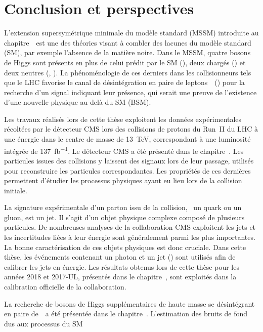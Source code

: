 \chapter*{Conclusion et perspectives}\label{chapter-conclusion}

L'extension supersymétrique minimale du modèle standard (MSSM)
introduite au chapitre~\
est une des théories visant à combler des lacunes du modèle standard (SM),
par exemple l'absence de la matière noire.
Dans le MSSM,
quatre bosons de Higgs sont présents en plus de celui prédit par le SM (\higgs),
deux chargés (\Higgspm)
et
deux neutres (\Higgs, \HiggsA).
La phénoménologie de ces derniers dans les collisionneurs tels que le LHC
favorise le canal de désintégration en paire de leptons~\tau\
(\HAtoTauTau)
pour la recherche d'un signal indiquant leur présence,
qui serait une preuve de l'existence d'une nouvelle physique
au-delà du SM (BSM).
\par
Les travaux réalisés lors de cette thèse
exploitent les données expérimentales
récoltées par le détecteur CMS
lors des collisions de protons du Run~II du LHC
à une énergie dans le centre de masse de \SI{13}{\TeV},
correspondant à une luminosité intégrée de \SI{137}{\femto\barn^{-1}}.
Le détecteur CMS a été présenté dans le chapitre~.
Les particules issues des collisions y laissent des signaux lors de leur passage,
utilisés pour reconstruire les particules correspondantes.
Les propriétés de ces dernières permettent d'étudier les processus physiques
ayant eu lieu lors de la collision initiale.
\par
La signature expérimentale
d'un parton issu de la collision, \ie\ un quark ou un gluon,
est un jet.
Il s'agit d'un objet physique complexe
composé de plusieurs particules.
De nombreuses analyses de la collaboration CMS exploitent les jets
et
les incertitudes liées à leur énergie sont généralement parmi les plus importantes.
La bonne caractérisation de ces objets physiques est donc cruciale.
Dans cette thèse,
les événements contenant un photon et un jet (\Gjet)
sont utilisés afin de calibrer les jets en énergie.
Les résultats obtenus lors de cette thèse pour les années 2018 et 2017-UL,
présentés dans le chapitre~\refChJERC,
sont exploités dans la calibration officielle de la collaboration.
\par
La recherche de bosons de Higgs supplémentaires de haute masse se désintégrant en paire de~\tau\
a été présentée dans le chapitre~.
L'estimation des bruits de fond dus aux processus du SM
